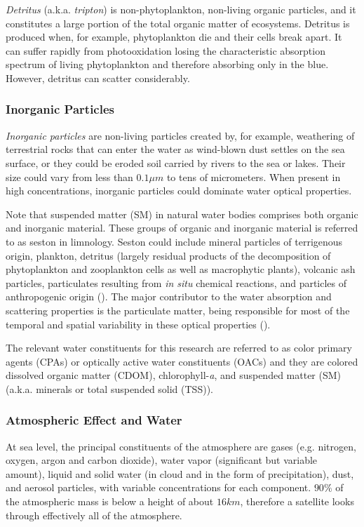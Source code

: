 {\it Detritus} (a.k.a. {\it tripton}) is non-phytoplankton, non-living organic particles, and it constitutes a large portion of the total organic matter of ecosystems. Detritus is produced when, for example, phytoplankton die and their cells break apart. It can suffer rapidly from photooxidation losing the characteristic absorption spectrum of living phytoplankton and therefore absorbing only in the blue. However, detritus can scatter considerably.  
\subsubsection*{Inorganic Particles}

{\it Inorganic particles} are non-living particles created by, for example, weathering of terrestrial rocks that can enter the water as wind-blown dust settles on the sea surface, or they could be eroded soil carried by rivers to the sea or lakes. Their size could vary from less than $0.1\mu m$ to tens of micrometers. When present in high concentrations, inorganic particles could dominate water optical properties.

Note that suspended matter (SM) in natural water bodies comprises both organic and inorganic material. These groups of organic and inorganic material is referred to as seston in limnology. Seston could include mineral particles of terrigenous origin, plankton, detritus (largely residual products of the decomposition of phytoplankton and zooplankton cells as well as macrophytic plants), volcanic ash particles, particulates resulting from {\it in situ} chemical reactions, and particles of anthropogenic origin (\cite{Bukata1995}). The major contributor to the water absorption and scattering properties is the particulate matter, being responsible for most of the temporal and spatial variability in these optical properties (\cite{Mobley:2001}).

The relevant water constituents for this research are referred to as color primary agents (CPAs) or optically active water constituents (OACs) and they are colored dissolved organic matter (CDOM), chlorophyll-{\it a}, and suspended matter (SM) (a.k.a. minerals or total suspended solid (TSS)).
\subsubsection{Atmospheric Effect and Water}
At sea level, the principal constituents of the atmosphere are gases (e.g. nitrogen, oxygen, argon and carbon dioxide), water vapor (significant but variable amount), liquid and solid water (in cloud and in the form of precipitation), dust, and aerosol particles, with variable concentrations for each component. $90\%$ of the atmospheric mass is below a height of about $16km$, therefore a satellite looks through effectively all of the atmosphere.

